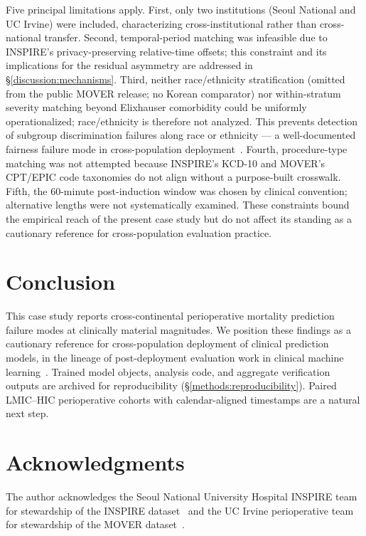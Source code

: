 Five principal limitations apply. First, only two institutions (Seoul National and UC Irvine) were included, characterizing cross-institutional rather than cross-national transfer. Second, temporal-period matching was infeasible due to INSPIRE's privacy-preserving relative-time offsets; this constraint and its implications for the residual asymmetry are addressed in \S\ref{discussion:mechanisms}. Third, neither race/ethnicity stratification (omitted from the public MOVER release; no Korean comparator) nor within-stratum severity matching beyond Elixhauser comorbidity could be uniformly operationalized; race/ethnicity is therefore not analyzed. This prevents detection of subgroup discrimination failures along race or ethnicity --- a well-documented fairness failure mode in cross-population deployment~\cite{Chen2020,Pfohl2021}. Fourth, procedure-type matching was not attempted because INSPIRE's KCD-10 and MOVER's CPT/EPIC code taxonomies do not align without a purpose-built crosswalk. Fifth, the 60-minute post-induction window was chosen by clinical convention; alternative lengths were not systematically examined. These constraints bound the empirical reach of the present case study but do not affect its standing as a cautionary reference for cross-population evaluation practice.

\section{Conclusion}
\label{sec:conclusion}

This case study reports cross-continental perioperative mortality prediction failure modes at clinically material magnitudes. We position these findings as a cautionary reference for cross-population deployment of clinical prediction models, in the lineage of post-deployment evaluation work in clinical machine learning~\cite{wong2021epic}. Trained model objects, analysis code, and aggregate verification outputs are archived for reproducibility (\S\ref{methods:reproducibility}). Paired LMIC--HIC perioperative cohorts with calendar-aligned timestamps are a natural next step.

\section*{Acknowledgments}
The author acknowledges the Seoul National University Hospital INSPIRE team for stewardship of the INSPIRE dataset~\cite{Lim2024} and the UC Irvine perioperative team for stewardship of the MOVER dataset~\cite{Samad2023}.

